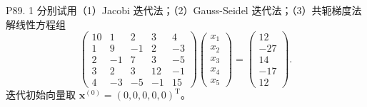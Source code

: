\documentclass[11pt, a4paper]{ctexart}
\begin{document}
\begin{problem}{P89. 1}
    分别试用（1）Jacobi 迭代法；（2）Gauss-Seidel 迭代法；（3）共轭梯度法解线性方程组
    \[
        \begin{pmatrix}
            10 & 1 & 2 & 3 & 4 \\
            1 & 9 & -1 & 2 & -3 \\
            2 & -1 & 7 & 3 & -5 \\
            3 & 2 & 3 & 12 & -1 \\
            4 & -3 & -5 & -1 & 15
        \end{pmatrix}
        \begin{pmatrix}
            x_1 \\
            x_2 \\
            x_3 \\
            x_4 \\
            x_5
        \end{pmatrix}
        =
        \begin{pmatrix}
            12 \\
            -27 \\
            14 \\
            -17 \\
            12
        \end{pmatrix}.
    \]
    迭代初始向量取 $\boldsymbol{x}^{(0)} = (0,0,0,0,0)^{\mathrm{T}}$。
\end{problem}
\end{document}
